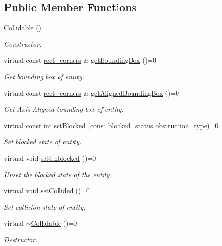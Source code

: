 \subsection*{Public Member Functions}
\begin{DoxyCompactItemize}
\item 
\hyperlink{classCollidable_a92ce9e2b08086bb2f466168ffc69c9ed}{Collidable} ()
\begin{DoxyCompactList}\small\item\em Constructor. \end{DoxyCompactList}\item 
virtual const \hyperlink{structrect__corners}{rect\-\_\-corners} \& \hyperlink{classCollidable_a3436effdcd9bea230f4a1aa32b8dd8ab}{get\-Bounding\-Box} ()=0
\begin{DoxyCompactList}\small\item\em Get bounding box of entity. \end{DoxyCompactList}\item 
virtual const \hyperlink{structrect__corners}{rect\-\_\-corners} \& \hyperlink{classCollidable_a6909df57a0915f044d5d967a3be086f3}{get\-Aligned\-Bounding\-Box} ()=0
\begin{DoxyCompactList}\small\item\em Get Axis Aligned bounding box of entity. \end{DoxyCompactList}\item 
virtual const int \hyperlink{classCollidable_a6d312198ba82d26b5e360733bb87a2f0}{set\-Blocked} (const \hyperlink{Structures_8h_a6fef29d9424addfa69bdd2a379424896}{blocked\-\_\-status} obstruction\-\_\-type)=0
\begin{DoxyCompactList}\small\item\em Set blocked state of entity. \end{DoxyCompactList}\item 
virtual void \hyperlink{classCollidable_a817d864d0640bc6bcb13bbecf14ddf31}{set\-Unblocked} ()=0
\begin{DoxyCompactList}\small\item\em Unset the blocked state of the entity. \end{DoxyCompactList}\item 
virtual void \hyperlink{classCollidable_a5ea0417bea000712171bbe5531705082}{set\-Collided} ()=0
\begin{DoxyCompactList}\small\item\em Set collision state of entity. \end{DoxyCompactList}\item 
virtual \hyperlink{classCollidable_ab742fb86ee54c44b706713b0d6876af7}{$\sim$\-Collidable} ()=0
\begin{DoxyCompactList}\small\item\em Destructor. \end{DoxyCompactList}\end{DoxyCompactItemize}


